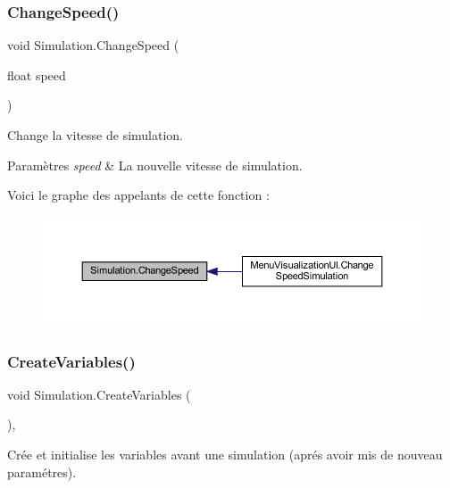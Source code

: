\subsubsection{\texorpdfstring{Change\+Speed()}{ChangeSpeed()}}
{\footnotesize\ttfamily void Simulation.\+Change\+Speed (\begin{DoxyParamCaption}\item[{float}]{speed }\end{DoxyParamCaption})\hspace{0.3cm}{\ttfamily [inline]}}



Change la vitesse de simulation. 


\begin{DoxyParams}{Paramètres}
{\em speed} & La nouvelle vitesse de simulation.\\
\hline
\end{DoxyParams}
Voici le graphe des appelants de cette fonction \+:\nopagebreak
\begin{figure}[H]
\begin{center}
\leavevmode
\includegraphics[width=350pt]{class_simulation_a3fde1a020def21f5f41794735b76c686_icgraph}
\end{center}
\end{figure}
\mbox{\label{class_simulation_aeb4bcb9efba94261ae3225d7c77d4fe9}} 
\subsubsection{\texorpdfstring{Create\+Variables()}{CreateVariables()}}
{\footnotesize\ttfamily void Simulation.\+Create\+Variables (\begin{DoxyParamCaption}{ }\end{DoxyParamCaption})\hspace{0.3cm}{\ttfamily [inline]}, {\ttfamily [private]}}



Crée et initialise les variables avant une simulation (aprés avoir mis de nouveau paramétres). 

